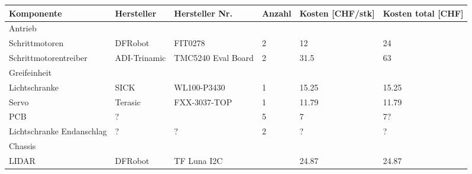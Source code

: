 \documentclass[main.tex]{subfiles} %
\begin{document}
\begin{table}[h]
    \centering
    \scriptsize %
    \begin{tabular}{|p{3cm}|p{3cm}|p{3cm}|p{1cm}|p{1.5cm}|p{1cm}|}
        \hline
        \textbf{Komponente}                    & \textbf{Hersteller} & \textbf{Hersteller Nr.} & \textbf{Anzahl} & \textbf{Kosten [CHF/stk]} & \textbf{Kosten total [CHF]} \\ \hline
        \rowcolor{lightgray} Antrieb           &                     &                         &                 &                           &                             \\ \hline
        Schrittmotoren                         & DFRobot             & FIT0278                 & 2               & 12                        & 24                          \\ \hline
        Schrittmotorentreiber                  & ADI-Trinamic        & TMC5240 Eval Board      & 2               & 31.5                      & 63                          \\ \hline
        \rowcolor{lightgray} Greifeinheit      &                     &                         &                 &                           &                             \\ \hline
        Lichtschranke                          & SICK                & WL100-P3430             & 1               & 15.25                     & 15.25                       \\ \hline
        Servo                                  & Terasic             & FXX-3037-TOP            & 1               & 11.79                     & 11.79                       \\ \hline
        PCB                                    & ?                   &                         & 5               & 7                         & 7?                          \\ \hline
        Lichtschranke Endanschlag              & ?                   & ?                       & 2               & ?                         & ?                           \\ \hline
        \rowcolor{lightgray} Chassis           &                     &                         &                 &                           &                             \\ \hline
        LIDAR                                  & DFRobot             & TF Luna I2C             &                 & 24.87                     & 24.87                       \\ \hline

\end{tabular}
\end{table}
\end{document}
